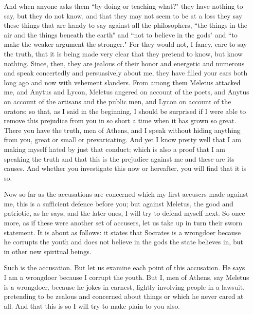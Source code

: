 \documentclass[letterpaper,12pt]{article}
\newcommand{\stephpag}[1]{\marginnote{\small\itshape\fontfamily{ppl}\selectfont #1}}
\begin{document}
And when anyone asks them ``by doing or teaching what?" they have nothing to say, but they do not know, and that they may not seem to be at a loss they say these things that are handy to say against all the philosophers, ``the things in the air and the things beneath the earth" and ``not to believe in the gods" and ``to make the weaker argument the stronger." For they would not, I fancy, care to say the truth, that it is being made very clear that they pretend to know, but know nothing. \stephpag{e} Since, then, they are jealous of their honor and energetic and numerous and speak concertedly and persuasively about me, they have filled your ears both long ago and now with vehement slanders. From among them Meletus attacked me, and Anytus and Lycon, Meletus angered on account of the poets, and Anytus on account of the artisans and the public men, \stephpag{24 a} and Lycon on account of the orators; so that, as I said in the beginning, I should be surprised if I were able to remove this prejudice from you in so short a time when it has grown so great. There you have the truth, men of Athens, and I speak without hiding anything from you, great or small or prevaricating. And yet I know pretty well that I am making myself hated by just that conduct; which is also a proof that I am speaking the truth and that this is the prejudice against me and these are its causes. And whether you investigate \stephpag{b} this now or hereafter, you will find that it is so.

Now so far as the accusations are concerned which my first accusers made against me, this is a sufficient defence before you; but against Meletus, the good and patriotic, as he says, and the later ones, I will try to defend myself next. So once more, as if these were another set of accusers, let us take up in turn their sworn statement. It is about as follows: it states that Socrates is a wrongdoer because he corrupts the youth and does not believe in the gods the state believes in, but in other \stephpag{c} new spiritual beings.

Such is the accusation. But let us examine each point of this accusation. He says I am a wrongdoer because I corrupt the youth. But I, men of Athens, say Meletus is a wrongdoer, because he jokes in earnest, lightly involving people in a lawsuit, pretending to be zealous and concerned about things or which he never cared at all. And that this is so I will try to make plain to you also.
\end{document}
